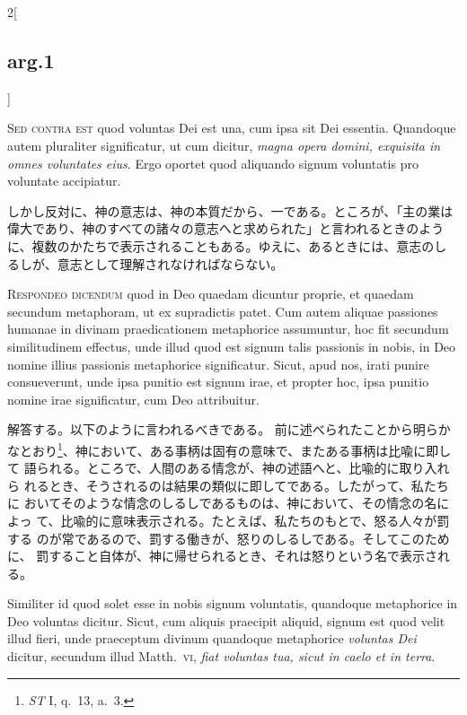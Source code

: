 \documentclass[paper=a4paper,fontsize=10pt,jafontsize=9pt,titlepage]{jlreq}
\begin{document}
\begin{paracol}{2}[\subsection{arg.1}]
\switchcolumn*[\subsection{s.c.}]


{\scshape Sed contra est} quod voluntas Dei est una,
cum ipsa sit Dei essentia. Quandoque autem pluraliter significatur, ut
cum dicitur, {\itshape magna opera domini, exquisita in omnes voluntates
eius}. Ergo oportet quod aliquando signum voluntatis pro voluntate
accipiatur.

\switchcolumn

しかし反対に、神の意志は、神の本質だから、一である。ところが、「主の業は
 偉大であり、神のすべての諸々の意志へと求められた」と言われるときのよう
 に、複数のかたちで表示されることもある。ゆえに、あるときには、意志のし
 るしが、意志として理解されなければならない。



{\scshape Respondeo dicendum} quod in Deo quaedam
dicuntur proprie, et quaedam secundum metaphoram, ut ex supradictis
patet. Cum autem aliquae passiones humanae in divinam praedicationem
metaphorice assumuntur, hoc fit secundum similitudinem effectus, unde
illud quod est signum talis passionis in nobis, in Deo nomine illius
passionis metaphorice significatur. Sicut, apud nos, irati punire
consueverunt, unde ipsa punitio est signum irae, et propter hoc, ipsa
punitio nomine irae significatur, cum Deo attribuitur.

\switchcolumn

解答する。以下のように言われるべきである。
前に述べられたことから明らかなとおり\footnote{{\itshape ST} I, q.~13,
 a.~3.}、神において、ある事柄は固有の意味で、またある事柄は比喩に即して
 語られる。ところで、人間のある情念が、神の述語へと、比喩的に取り入れら
 れるとき、そうされるのは結果の類似に即してである。したがって、私たちに
 おいてそのような情念のしるしであるものは、神において、その情念の名によっ
 て、比喩的に意味表示される。たとえば、私たちのもとで、怒る人々が罰する
 のが常であるので、罰する働きが、怒りのしるしである。そしてこのために、
 罰すること自体が、神に帰せられるとき、それは怒りという名で表示される。

\switchcolumn*


Similiter id quod
solet esse in nobis signum voluntatis, quandoque metaphorice in Deo
voluntas dicitur. Sicut, cum aliquis praecipit aliquid, signum est quod
velit illud fieri, unde praeceptum divinum quandoque metaphorice
{\itshape voluntas Dei} dicitur, secundum illud Matth.~{\scshape vi}, {\itshape fiat voluntas tua, sicut
in caelo et in terra}.


\end{paracol}
\end{document}

